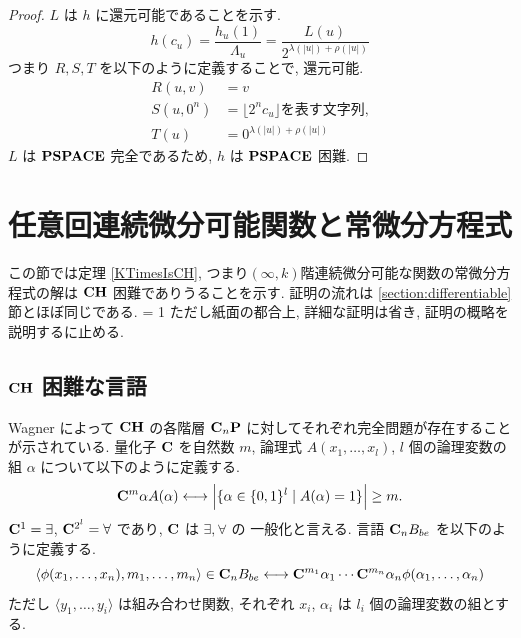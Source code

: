 \begin{proof}
 $L$ は $h$ に還元可能であることを示す.
 \begin{equation}
  h(c_u) = \frac{h_u(1)}{\Lambda_u}
   = \frac{L(u)}{2^{\lambda(|u|)+\rho(|u|)}}
 \end{equation}
 つまり $R,S,T$ を以下のように定義することで, 還元可能.
 \begin{align}
  R(u,v) &= v \\
  S(u, 0^n) &= \lfloor 2^nc_u \rfloor \text{を表す文字列,} \\
  T(u) &= 0^{\lambda(|u|)+\rho(|u|)}
 \end{align}
 $L$ は $\mathbf{PSPACE}$ 完全であるため, $h$ は $\mathbf{PSPACE}$ 困難.
\end{proof}


\section{任意回連続微分可能関数と常微分方程式}

この節では定理 \ref{KTimesIsCH}, 
つまり$(\infty, k)$階連続微分可能な関数の常微分方程式の解は
$\mathbf{CH}$ 困難でありうることを示す.
証明の流れは \ref{section:differentiable} 節とほぼ同じである.
\ifnum \proc = 1
ただし紙面の都合上, 詳細な証明は省き, 証明の概略を説明するに止める.
\fi


\subsection{$\mathbf{CH}$ 困難な言語}

Wagner によって $\mathbf{CH}$ の各階層 $\mathbf{C}_n \mathbf{P}$ に対してそれぞれ完全問題が存在することが示されている\cite{wagner1986complexity}.
量化子 $\mathbf{C}$ を自然数 $m$, 論理式 $A(x_1, \dots, x_l)$, 
$l$ 個の論理変数の組 $\alpha$ について以下のように定義する.
\begin{equation}
 \mathbf{C}^m \alpha A(\alpha) 
  \longleftrightarrow 
  \Bigl|\{\alpha \in \{0,1\}^l \mid A(\alpha) = 1\}\Bigr| \ge m.
\end{equation}
$\mathbf{C}^1 = \exists$, $\mathbf{C}^{2^l} = \forall$ であり, $\mathbf{C}$ は $\exists, \forall$ の
一般化と言える.
言語 $\mathbf{C}_n B_{be}$ を以下のように定義する.
\begin{equation}
 \langle \phi(x_1, \dots, x_n), m_1, \dots, m_n \rangle \in \mathbf{C}_n B_{be}
 \longleftrightarrow
 \mathbf{C}^{m_1}{\alpha_1} \cdots \mathbf{C}^{m_n}{\alpha_n} \phi(\alpha_1, \dots, \alpha_n) 
\end{equation}
ただし $\langle y_1, \dots, y_i \rangle$ は組み合わせ関数,
それぞれ $x_i$, $\alpha_i$ は $l_i$ 個の論理変数の組とする.


